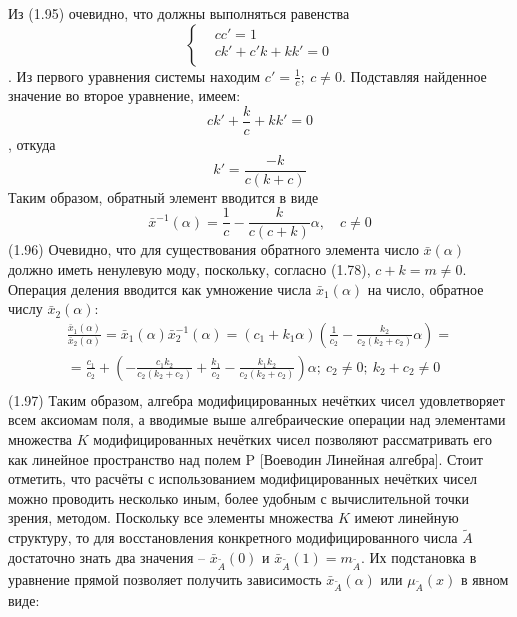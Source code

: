 Из (1.95) очевидно, что должны выполняться равенства
	\[\left\{ \begin{aligned}
  & c{c}'=1 \\ 
 & c{k}'+{c}'k+k{k}'=0 \\ 
\end{aligned} \right.\].
Из первого уравнения системы находим ${c}'=\frac{1}{c};\ c\ne 0$. Подставляя найденное значение во второе уравнение, имеем:
	\[c{k}'+\frac{k}{c}+k{k}'=0\],
откуда
	\[{k}'=\frac{-k}{c(k+c)}\] 
Таким образом, обратный элемент вводится в виде
	\[{{\bar{x}}^{-1}}(\alpha )=\frac{1}{c}-\frac{k}{c(c+k)}\alpha ,\quad c\ne 0\] 	(1.96)
Очевидно, что для существования обратного элемента число $\bar{x}\left( \alpha  \right)$ должно иметь ненулевую моду, поскольку, согласно (1.78), $c+k=m\ne 0$.
Операция деления вводится как умножение числа ${{\bar{x}}_{1}}\left( \alpha  \right)$ на число, обратное числу ${{\bar{x}}_{2}}\left( \alpha  \right)$:
	\[\begin{matrix}
  \frac{{{{\bar{x}}}_{1}}\left( \alpha  \right)}{{{{\bar{x}}}_{2}}\left( \alpha  \right)}={{{\bar{x}}}_{1}}\left( \alpha  \right)\bar{x}_{2}^{-1}\left( \alpha  \right)=\left( {{c}_{1}}+{{k}_{1}}\alpha  \right)\left( \frac{1}{{{c}_{2}}}-\frac{{{k}_{2}}}{{{c}_{2}}\left( {{k}_{2}}+{{c}_{2}} \right)}\alpha  \right)= \\ 
  =\frac{{{c}_{1}}}{{{c}_{2}}}+\left( -\frac{{{c}_{1}}{{k}_{2}}}{{{c}_{2}}\left( {{k}_{2}}+{{c}_{2}} \right)}+\frac{{{k}_{1}}}{{{c}_{2}}}-\frac{{{k}_{1}}{{k}_{2}}}{{{c}_{2}}\left( {{k}_{2}}+{{c}_{2}} \right)} \right)\alpha ;\ {{c}_{2}}\ne 0;\ {{k}_{2}}+{{c}_{2}}\ne 0 \\ 
\end{matrix}\] 	(1.97)
Таким образом, алгебра модифицированных нечётких чисел удовлетворяет всем аксиомам поля, а вводимые выше алгебраические операции над элементами множества $K$ модифицированных нечётких чисел позволяют рассматривать его как линейное пространство над полем P [Воеводин Линейная алгебра].
Стоит отметить, что расчёты с использованием модифицированных нечётких чисел можно проводить несколько иным, более удобным с вычислительной точки зрения, методом. Поскольку все элементы множества $K$ имеют линейную структуру, то для восстановления конкретного модифицированного числа $\tilde{A}$ достаточно знать два значения – ${{\bar{x}}_{{\tilde{A}}}}\left( 0 \right)$ и ${{\bar{x}}_{{\tilde{A}}}}\left( 1 \right)={{m}_{{\tilde{A}}}}$. Их подстановка в уравнение прямой позволяет получить зависимость ${{\bar{x}}_{{\tilde{A}}}}\left( \alpha  \right)$ или ${{\mu }_{{\tilde{A}}}}\left( x \right)$ в явном виде:
